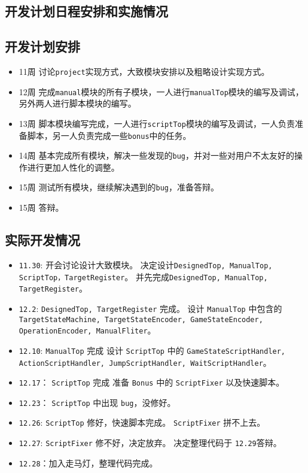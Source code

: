 \documentclass[12pt, a4paper]{ctexart}
\begin{document}
\subsection{开发计划日程安排和实施情况}
\subsection*{开发计划安排}
\begin{itemize}
	\item 11周 讨论\texttt{project}实现方式，大致模块安排以及粗略设计实现方式。
	\item 12周 完成\texttt{manual}模块的所有子模块，一人进行\texttt{manualTop}模块的编写及调试，另外两人进行脚本模块的编写。
	\item 13周 脚本模块编写完成，一人进行\texttt{scriptTop}模块的编写及调试，一人负责准备脚本，另一人负责完成一些\texttt{bonus}中的任务。
	\item 14周 基本完成所有模块，解决一些发现的\texttt{bug}，并对一些对用户不太友好的操作进行更加人性化的调整。
	\item 15周 测试所有模块，继续解决遇到的\texttt{bug}，准备答辩。
	\item 15周 答辩。
\end{itemize}


\subsection*{实际开发情况}
\begin{itemize}
\item \texttt{11.30}: 开会讨论设计大致模块。
                决定设计\texttt{DesignedTop, ManualTop, ScriptTop，TargetRegister}。
                并先完成\texttt{DesignedTop, ManualTop, TargetRegister}。
                
\item \texttt{12.2}: \texttt{DesignedTop, TargetRegister} 完成。
                设计 \texttt{ManualTop} 中包含的 \texttt{TargetStateMachine, TargetStateEncoder, GameStateEncoder, OperationEncoder, ManualFliter}。
                
\item \texttt{12.10}: \texttt{ManualTop} 完成
                设计 \texttt{ScriptTop} 中的 \texttt{GameStateScriptHandler, ActionScriptHandler, JumpScriptHandler, WaitScriptHandler}。
                
\item \texttt{12.17}： \texttt{ScriptTop} 完成
                准备 \texttt{Bonus} 中的 \texttt{ScriptFixer} 以及快速脚本。
                
\item \texttt{12.23}： \texttt{ScriptTop} 中出现 \texttt{bug}，没修好。
\item \texttt{12.26}: \texttt{ScriptTop} 修好，快速脚本完成。
                        \texttt{ScriptFixer} 拼不上去。
\item \texttt{12.27}: \texttt{ScriptFixer} 修不好，决定放弃。
                      决定整理代码于 \texttt{12.29}答辩。
\item \texttt{12.28}：加入走马灯，整理代码完成。
\end{itemize}
\end{document}

